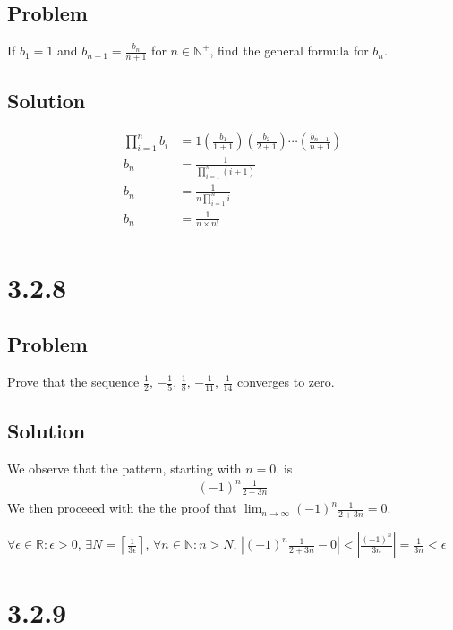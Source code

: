 \documentclass[12pt]{article}
\newcommand{\round}[1]{\left(       #1 \right)      }
\newcommand{\abs}  [1]{\left|       #1 \right|      }
\newcommand{\ceil} [1]{\left\lceil  #1 \right\rceil }
\newcommand{\R}    [0]{\mathbb{R}                   }
\newcommand{\N}    [0]{\mathbb{N}                   }
\begin{document}
\subsection*{Problem}
If $b_1 = 1$ and $b_{n+1} = \frac{b_n}{n+1}$ for $n \in \N^+$, find the general formula for $b_n$.

\subsection*{Solution}
\begin{align*}
    \prod_{i = 1}^n b_i &= 1 \round{\frac{b_1}{1 + 1}} \round{\frac{b_2}{2 + 1}} \cdots \round{\frac{b_{n - 1}}{n + 1}} \\
    b_n &= \frac{1}{\prod_{i = 1}^n (i + 1)} \\
    b_n &= \frac{1}{n \prod_{i = 1}^n i} \\
    b_n &= \frac{1}{n \times n!} \\
\end{align*}



\section*{3.2.8}

\subsection*{Problem}
Prove that the sequence $\frac{1}{2}$, $-\frac{1}{5}$, $\frac{1}{8}$, $-\frac{1}{11}$, $\frac{1}{14}$ converges to zero.

\subsection*{Solution}
We observe that the pattern, starting with $n = 0$, is
\begin{align*}
    (-1)^n \frac{1}{2 + 3n}
\end{align*}
We then proceeed with the the proof that $\lim_{n \to \infty} (-1)^n \frac{1}{2 + 3n} = 0$.

$\forall \epsilon \in \R : \epsilon > 0$, $\exists N = \ceil{\frac{1}{3 \epsilon}}$, $\forall n \in \N : n > N$, $\abs{(-1)^n \frac{1}{2 + 3n} - 0} < \abs{\frac{(-1)^n}{3n}} = \frac{1}{3n} < \epsilon$



\section*{3.2.9}
\end{document}
